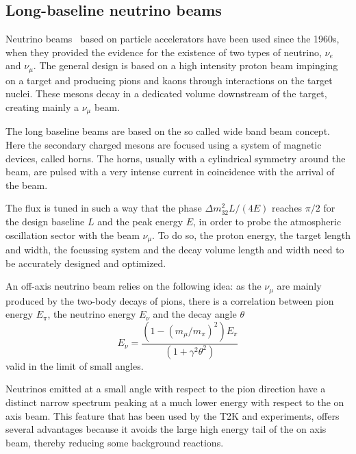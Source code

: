 \subsection{Long-baseline neutrino beams }

Neutrino beams~\cite{Kopp2007101} based on particle accelerators have been used since the 1960s, when they provided the evidence for the existence of two types of neutrino, $\nu_e$ and $\nu_\mu$. The general design is based on a high intensity proton beam impinging on a target and producing pions and kaons through interactions on the target nuclei. 
These mesons decay in a dedicated volume downstream of the target, creating mainly a $\nu_\mu$ beam.  

The long baseline beams are based on the so called wide band beam concept. Here the secondary charged mesons are focused using a system of magnetic devices, called horns. The horns, usually with a cylindrical symmetry around the beam, are pulsed with a very intense current in coincidence with the arrival of the beam. 

The flux is tuned in such a way that the phase $\Delta m^2_{32} L/ (4 E)$ reaches $\pi/2$ for the design baseline $L$ and the peak energy $E$, in order to probe the atmospheric oscillation sector with the beam $\nu_\mu$. To do so, the proton energy, the target length and width, the focussing system and the decay volume length and width need to be accurately designed and optimized.   

An off-axis neutrino beam \cite{1995bnl} relies on the following idea: as the $\nu_\mu$ are mainly produced by the two-body decays of pions, there is a correlation between pion energy $E_\pi$, the neutrino energy $E_\nu$ and the decay angle $\theta$ 
\begin{equation}
E_\nu = \frac{(1-(m_\mu/m_\pi)^2) E_\pi}{(1+\gamma^2 \theta^2) } 
\end{equation}
valid in the limit of small angles.

Neutrinos emitted at a small angle with respect to the pion direction have a distinct narrow spectrum peaking at a much lower energy with respect to the on axis beam. This feature that has been used by the T2K and \nova experiments, offers several advantages because it avoids the large high energy tail of the on axis beam, thereby reducing some background reactions. 

